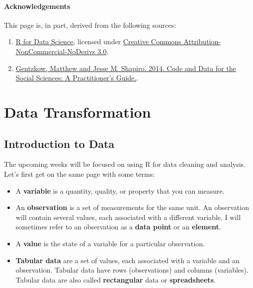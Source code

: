 \documentclass[
]{book}
\begin{document}
\hypertarget{acknowledgements}{%
\subsubsection*{Acknowledgements}\label{acknowledgements}}

This page is, in part, derived from the following sources:

\begin{enumerate}
\def\labelenumi{\arabic{enumi}.}
\item
  \href{https://r4ds.had.co.nz}{R for Data Science}, licensed under \href{https://creativecommons.org/licenses/by-nc-nd/3.0/us/}{Creative Commons Attribution-NonCommercial-NoDerivs 3.0}.
\item
  \href{https://web.stanford.edu/~gentzkow/research/CodeAndData.pdf}{Gentzkow, Matthew and Jesse M. Shapiro. 2014. Code and Data for the Social Sciences: A Practitioner's Guide.}.
\end{enumerate}

\hypertarget{data-transformation}{%
\chapter{Data Transformation}\label{data-transformation}}

\hypertarget{introduction-to-data}{%
\section{Introduction to Data}\label{introduction-to-data}}

The upcoming weeks will be focused on using R for data cleaning and analysis. Let's first get on the same page with some terms:

\begin{itemize}
\item
  A \textbf{variable} is a quantity, quality, or property that you can measure.
\item
  An \textbf{observation} is a set of measurements for the same unit. An observation will contain several values, each associated with a different variable. I will sometimes refer to an observation as a \textbf{data point} or an \textbf{element}.
\item
  A \textbf{value} is the state of a variable for a particular observation.
\item
  \textbf{Tabular data} are a set of values, each associated with a variable and an observation. Tabular data have rows (observations) and columns (variables). Tabular data are also called \textbf{rectangular} data or \textbf{spreadsheets}.
\end{itemize}
\end{document}
